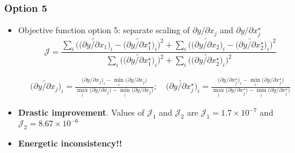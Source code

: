 \begin{frame}
	\frametitle[]{Option 5  \hspace{8cm}}
	\footnotesize
	
	\vspace{0mm}
	
	\begin{itemize}
		\item Objective function option 5: separate scaling of $\partial y/\partial x_j$ and $\partial y/\partial x_j^{\star}$
		\begin{equation*}
			\boxed{\mathcal{J}  =  \frac{\sum_i \Bigg(\Big(\widetilde{\partial y/\partial x_1}\Big)_i-\Big(\widetilde{\partial y/\partial x_1^{\star}}\Big)_i\Bigg)^2 + \sum_i \Bigg(\Big(\widetilde{\partial y/\partial x_2}\Big)_i-\Big(\widetilde{\partial y/\partial x_2^{\star}}\Big)_i\Bigg)^2}{\sum_i\Bigg(\Big(\widetilde{\partial y/\partial x_1^{\star}}\Big)_i\Bigg)^2 + \sum_i\Bigg(\Big(\widetilde{\partial y/\partial x_2^{\star}}\Big)_i\Bigg)^2}}
		\end{equation*}


\begin{equation*}
	\begin{aligned}
	\Big(\widetilde{\partial y/\partial x_j}\Big)_i  =  \frac{\Big(\partial y/\partial x_j\Big)_i-\min_{i}\Big(\partial y/\partial x_j\Big)}{\max_{i}\Big(\partial y/\partial x_j\Big)-\min_{i}\Big(\partial y/\partial x_j\Big)};\quad
	\Big(\widetilde{\partial y/\partial x_j^{\star}}\Big)_i  =  \frac{\Big(\partial y/\partial x_j^{\star}\Big)_i-\min_{i}\Big(\partial y/\partial x_j^{\star}\Big)}{\max_{i}\Big(\partial y/\partial x_j^{\star}\Big)-\min_{i}\Big(\partial y/\partial x_j^{\star}\Big)}	
	\end{aligned}
\end{equation*}		
		
		\begin{center}
			
		\end{center}				
		
		\item \textcolor[rgb]{1.0,0.0,0.0}{\textbf{Drastic improvement}}. Values of $\mathcal{J}_1$	and $\mathcal{J}_2$ are $\mathcal{J}_1  =  1.7\times 10^{-7}$ and $\mathcal{J}_2=8.67\times 10^{-6}$

		\item \textcolor[rgb]{1.0,0.0,0.0}{\textbf{Energetic inconsistency!!}}

		
	\end{itemize}		
	
	
\end{frame}





